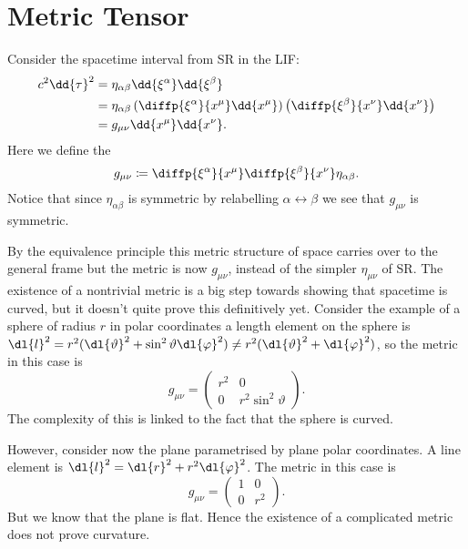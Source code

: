 \documentclass[fleqn]{NotesClass}
\begin{document}
    \section{Metric Tensor}
    Consider the spacetime interval from SR in the LIF:
    \begin{align}
        c^2\dd{\tau}^2 &= \eta_{\alpha\beta}\dd{\xi^\alpha}\dd{\xi^\beta}\\
        &= \eta_{\alpha\beta}\left( \diffp{\xi^\alpha}{x^\mu}\dd{x^\mu} \right)\left( \diffp{\xi^\beta}{x^\nu}\dd{x^\nu} \right)\\
        &= g_{\mu\nu}\dd{x^\mu}\dd{x^\nu}.
    \end{align}
    Here we define the 
    \begin{equation}\label{eqn:metric tensor}
        g_{\mu\nu} \coloneqq \diffp{\xi^\alpha}{x^\mu}\diffp{\xi^\beta}{x^\nu}\eta_{\alpha\beta}.
    \end{equation}
    Notice that since \(\eta_{\alpha\beta}\) is symmetric by relabelling \(\alpha \leftrightarrow \beta\) we see that \(g_{\mu\nu}\) is symmetric.
    
    By the equivalence principle this metric structure of space carries over to the general frame but the metric is now \(g_{\mu\nu}\), instead of the simpler \(\eta_{\mu\nu}\) of SR.
    The existence of a nontrivial metric is a big step towards showing that spacetime is curved, but it doesn't quite prove this definitively yet.
    Consider the example of a sphere of radius \(r\) in polar coordinates a length element on the sphere is \(\dl{l}^2 = r^2(\dl{\vartheta}^2 + \sin^2\vartheta\dl{\varphi}^2) \ne r^2(\dl{\vartheta}^2 + \dl{\varphi}^2)\), so the metric in this case is
    \begin{equation}
        g_{\mu\nu} = 
        \begin{pmatrix}
            r^2 & 0\\
            0 & r^2\sin^2\vartheta
        \end{pmatrix}
        .
    \end{equation}
    The complexity of this is linked to the fact that the sphere is curved.
    
    However, consider now the plane parametrised by plane polar coordinates.
    A line element is \(\dl{l}^2 = \dl{r}^2 + r^2\dl{\varphi}^2\).
    The metric in this case is
    \begin{equation}
        g_{\mu\nu} = 
        \begin{pmatrix}
            1 & 0\\
            0 & r^2
        \end{pmatrix}
        .
    \end{equation}
    But we know that the plane is flat.
    Hence the existence of a complicated metric does not prove curvature.
    
\end{document}
